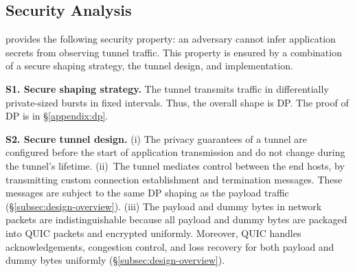 \subsection{{Security Analysis}}
\label{subsec:impl-security}
{\sys} provides the following security property: an adversary cannot infer
application secrets from observing tunnel traffic. This
property is ensured by a combination of a secure shaping strategy, the tunnel design,
and implementation.

{\bf S1. Secure shaping strategy.} The tunnel transmits traffic in
differentially private-sized bursts
in fixed intervals. Thus, the overall shape is DP. The proof of DP is in
\S\ref{appendix:dp}.

{\bf S2. Secure tunnel design.}
(i) The privacy guarantees of a tunnel are configured before the start of
application transmission and do not change during the tunnel's lifetime.
(ii)~The tunnel mediates control between the end hosts, \eg by
transmitting custom connection establishment and termination messages. These
messages are subject to the same DP shaping as the payload traffic
(\S\ref{subsec:design-overview}).
(iii) The payload and dummy bytes in network packets are indistinguishable
because all payload and dummy bytes are packaged into QUIC packets and
encrypted uniformly. Moreover, QUIC handles acknowledgements, congestion
control, and loss recovery for both payload and dummy bytes uniformly
(\S\ref{subsec:design-overview}).

